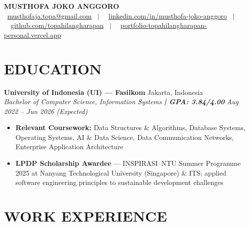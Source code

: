 \documentclass[10pt,a4paper]{article}
\newcommand{\contactline}[1]{\small #1}
\newcommand{\experienceheader}[4]{
    \textbf{#1} \hfill #2 \\
    \textit{#3} \hfill \textit{#4}
}
\begin{document}
\begin{center}
    {\LARGE \textbf{MUSTHOFA JOKO ANGGORO}} \\[2pt]
    \contactline{
        \faEnvelope\ \href{mailto:musthofaja.topa@gmail.com}{musthofaja.topa@gmail.com} \ $|$ \ 
        \faLinkedin\ \href{https://www.linkedin.com/in/musthofa-joko-anggoro/}{linkedin.com/in/musthofa-joko-anggoro} \ $|$ \
        \faGithub\ \href{https://github.com/topahilangharapan}{github.com/topahilangharapan} \ $|$ \
        \faGlobe\ \href{https://portfolio-topahilangharapan-personal.vercel.app/}{portfolio-topahilangharapan-personal.vercel.app}
    }
\end{center}

\vspace{-8pt}

\section*{EDUCATION}

\experienceheader{University of Indonesia (UI) — Fasilkom}{Jakarta, Indonesia}{Bachelor of Computer Science, Information Systems \textbf{| GPA: 3.84/4.00}}{Aug 2022 -- Jun 2026 (Expected)}
\begin{itemize}[leftmargin=*, itemsep=0.5pt, topsep=1pt]
    \item \textbf{Relevant Coursework:} Data Structures \& Algorithms, Database Systems, Operating Systems, AI \& Data Science, Data Communication Networks, Enterprise Application Architecture
    \item \textbf{LPDP Scholarship Awardee} — INSPIRASI--NTU Summer Programme 2025 at Nanyang Technological University (Singapore) \& ITS; applied software engineering principles to sustainable development challenges
\end{itemize}

\vspace{-4pt}

\section*{WORK EXPERIENCE}
\end{document}

